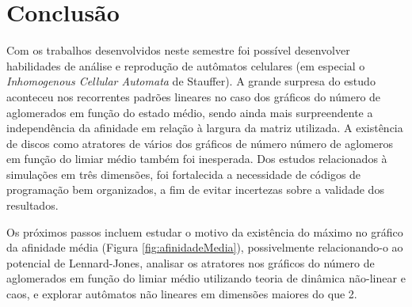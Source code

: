 \documentclass[
	12pt,				%
	openright,			%
	twoside,			%
	a4paper,			%
	english,			%
	french,				%
	spanish,			%
	brazil				%
	]{abntex2}
\begin{document}
\chapter{Conclusão}

Com os trabalhos desenvolvidos neste semestre foi possível desenvolver habilidades de análise e reprodução de autômatos celulares (em especial o \textit{Inhomogenous Cellular Automata} de Stauffer). A grande surpresa do estudo aconteceu nos recorrentes padrões lineares no caso dos gráficos do número de aglomerados em função do estado médio, sendo ainda mais surpreendente a independência da afinidade em relação à largura da matriz utilizada. A existência de discos como atratores de vários dos gráficos de número número de aglomeros em função do limiar médio também foi inesperada. Dos estudos relacionados à simulações em três dimensões, foi fortalecida a necessidade de códigos de programação bem organizados, a fim de evitar incertezas sobre a validade dos resultados.

Os próximos passos incluem estudar o motivo da existência do máximo no gráfico da afinidade média (Figura \ref{fig:afinidadeMedia}), possivelmente relacionando-o ao potencial de Lennard-Jones, analisar os atratores nos gráficos do número de aglomerados em função do limiar médio utilizando teoria de dinâmica não-linear e caos, e explorar autômatos não lineares em dimensões maiores do que 2.

\postextual



%
%

\end{document}
